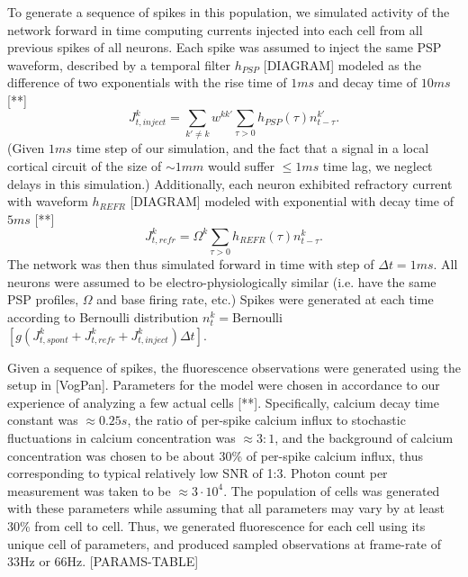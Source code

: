 \documentclass[amsmath,amssymb]{revtex4}
\begin{document}
To generate a sequence of spikes in this population, we simulated activity of the network forward in time computing currents injected into each cell from all previous spikes of all neurons. Each spike was assumed to inject the same PSP waveform, described by a temporal filter $h_{PSP}$ [DIAGRAM] modeled as the difference of two exponentials with the rise time of $1ms$ and decay time of $10ms$ [**]
\begin{equation}
J^k_{t, inject} = \sum_{k'\neq k}w^{kk'}\sum_{\tau>0}
h_{PSP}(\tau) n^{k'}_{t-\tau}.
\end{equation}
(Given $1ms$ time step of our simulation, and the fact that
a signal in a local cortical circuit of the size of $\sim 1mm$
would suffer $\leq 1ms$ time lag, we neglect delays
in this simulation.) Additionally, each neuron exhibited refractory current with waveform $h_{REFR}$ [DIAGRAM] modeled with exponential with decay time of $5ms$ [**]
\begin{equation}
J^k_{t,{refr}} = \Omega^k \sum_{\tau>0}h_{REFR}(\tau) n^{k}_{t-\tau}.
\end{equation}
The network was then thus simulated forward in time with step of $\Delta t=1ms$. All neurons were assumed to be electro-physiologically similar (i.e. have the same PSP profiles, $\Omega$ and base firing rate, etc.) Spikes were generated at each time according to Bernoulli distribution
$n^k_t=$Bernoulli$[g(J^k_{t,spont}+J^k_{t,refr}+J^k_{t,inject})\Delta t]$.

Given a sequence of spikes, the fluorescence observations were generated using the setup in [VogPan]. Parameters for the model were chosen in accordance to our experience of analyzing a few actual cells [**]. Specifically, calcium decay time constant was $\approx 0.25 s$, the ratio of per-spike calcium influx to stochastic fluctuations in calcium concentration was $\approx3:1$,
and the background of calcium concentration was chosen to be about 30\% of per-spike calcium influx, thus corresponding to typical relatively low SNR of 1:3. Photon count per measurement was taken to be $\approx 3\cdot 10^4$. The population of cells was generated with these parameters while assuming that all parameters may vary by at least 30\% from cell to cell. Thus, we generated fluorescence for each cell using its unique cell of parameters, and produced sampled observations at frame-rate of 33Hz or 66Hz. [PARAMS-TABLE]
\end{document}
